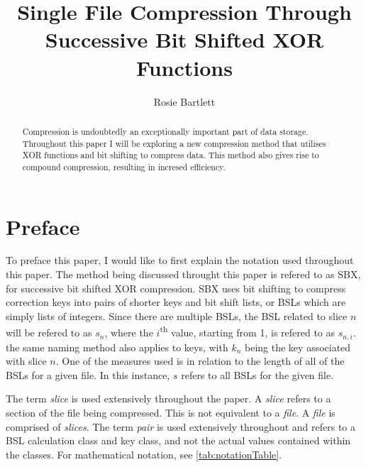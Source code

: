 \documentclass{hehe}
\title{Single File Compression Through Successive Bit Shifted XOR Functions}
\author{Rosie Bartlett}
\begin{document}
\maketitle

\begin{abstract}
Compression is undoubtedly an exceptionally important part of data storage. Throughout this paper I will be exploring a new compression method that utilises XOR functions and bit shifting to compress data. This method also gives rise to compound compression, resulting in incresed efficiency.\\
\end{abstract}

\section{Preface}

To preface this paper, I would like to first explain the notation used throughout this paper. The method being discussed throught this paper is refered to as SBX, for successive bit shifted XOR compression. SBX uses bit shifting to compress correction keys into pairs of shorter keys and bit shift lists, or BSLs which are simply lists of integers. Since there are multiple BSLs, the BSL related to slice $n$ will be refered to as $s_n$, where the $i$\textsuperscript{th} value, starting from 1, is refered to as $s_{n,i}$. the same naming method also applies to keys, with $k_n$ being the key associated with slice $n$. One of the measures used is in relation to the length of all of the BSLs for a given file. In this instance, $s$ refers to all BSLs for the given file.

The term \textit{slice} is used extensively throughout the paper. A \textit{slice} refers to a section of the file being compressed. This is not equivalent to a \textit{file}. A \textit{file} is comprised of \textit{slices}. The term \textit{pair} is used extensively throughout and refers to a BSL calculation class and key class, and not the actual values contained within the classes. For mathematical notation, see \cref{tab:notationTable}.
\end{document}
